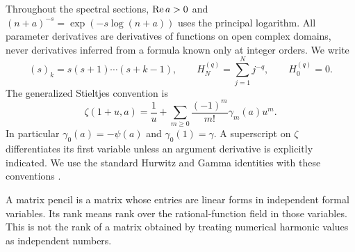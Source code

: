 Throughout the spectral sections, $\operatorname{Re} a>0$ and
$(n+a)^{-s}=\exp(-s\log(n+a))$ uses the principal logarithm. All
parameter derivatives are derivatives of functions on open complex
domains, never derivatives inferred from a formula known only at integer
orders. We write
\[
 (s)_k=s(s+1)\cdots(s+k-1),\qquad
 H_N^{(q)}=\sum_{j=1}^N j^{-q},\qquad H_0^{(q)}=0.
\]
The generalized Stieltjes convention is
\begin{equation}\label{eq:stieltjes}
 \zeta(1+u,a)=\frac1u+
 \sum_{m\ge0}\frac{(-1)^m}{m!}\gamma_m(a)u^m.
\end{equation}
In particular $\gamma_0(a)=-\psi(a)$ and $\gamma_0(1)=\gamma$.
A superscript on $\zeta$ differentiates its first variable unless an
argument derivative is explicitly indicated. We use the standard Hurwitz
and Gamma identities with these conventions \cite{dlmf:hurwitz,dlmf:gamma}.

A matrix pencil is a matrix whose entries are linear forms in independent
formal variables. Its rank means rank over the rational-function field in
those variables. This is not the rank of a matrix obtained by treating
numerical harmonic values as independent numbers.
